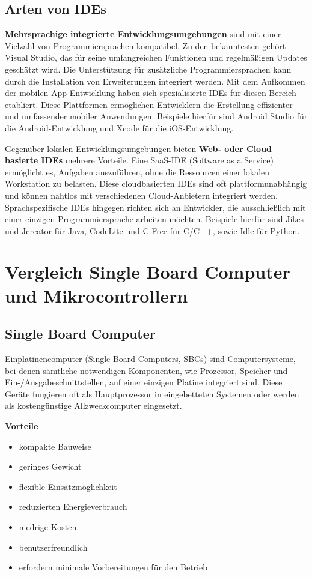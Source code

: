 \subsection{Arten von IDEs}
\textbf{Mehrsprachige integrierte Entwicklungsumgebungen} sind mit einer Vielzahl von Programmiersprachen kompatibel. Zu den bekanntesten gehört Visual Studio, das für seine umfangreichen Funktionen und regelmäßigen Updates geschätzt wird. Die Unterstützung für zusätzliche Programmiersprachen kann durch die Installation von Erweiterungen integriert werden. Mit dem Aufkommen der mobilen App-Entwicklung haben sich spezialisierte IDEs für diesen Bereich etabliert. Diese Plattformen ermöglichen Entwicklern die Erstellung effizienter und umfassender mobiler Anwendungen. Beispiele hierfür sind Android Studio für die Android-Entwicklung und Xcode für die iOS-Entwicklung.

Gegenüber lokalen Entwicklungsumgebungen bieten \textbf{Web- oder Cloud basierte IDEs} mehrere Vorteile. Eine SaaS-IDE (Software as a Service) ermöglicht es, Aufgaben auszuführen, ohne die Ressourcen einer lokalen Workstation zu belasten. Diese cloudbasierten IDEs sind oft plattformunabhängig und können nahtlos mit verschiedenen Cloud-Anbietern integriert werden.
Sprachspezifische IDEs hingegen richten sich an Entwickler, die ausschließlich mit einer einzigen Programmiersprache arbeiten möchten. Beispiele hierfür sind Jikes und Jcreator für Java, CodeLite und C-Free für C/C++, sowie Idle für Python. \textcite{integrierteEntwicklungsumgebung}



\section{Vergleich Single Board Computer und Mikrocontrollern}
\subsection{Single Board Computer}
Einplatinencomputer (Single-Board Computers, SBCs) sind Computersysteme, bei denen sämtliche notwendigen Komponenten, wie Prozessor, Speicher und Ein-/Ausgabeschnittstellen, auf einer einzigen Platine integriert sind. Diese Geräte fungieren oft als Hauptprozessor in eingebetteten Systemen oder werden als kostengünstige Allzweckcomputer eingesetzt.

\textbf{Vorteile}
\begin{itemize}
	\item kompakte Bauweise
	\item geringes Gewicht
	\item flexible Einsatzmöglichkeit
	\item reduzierten Energieverbrauch 
	\item niedrige Kosten
	\item benutzerfreundlich
	\item erfordern minimale Vorbereitungen für den Betrieb
\end{itemize}

